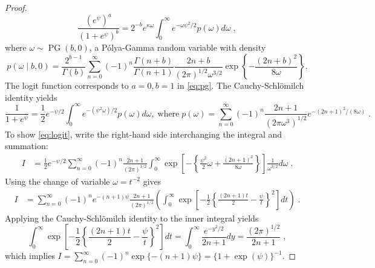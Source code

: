 \documentclass[ECP]{ejpecp} %
\def\CS{Cauchy-Schl\"omilch}
\def\PG{P{\'o}lya-Gamma}
\newcommand{\half}{\frac{1}{2}}
\begin{document}
\begin{proof}
\begin{equation}
  \frac{(e^{\psi})^a}{(1+e^{\psi})^b} = 2^{-b} e^{\kappa \omega} 
  \int_0^{\infty} e^{-\omega \psi^2/2} p(\omega) d\omega
  \;, 
  \label{eq:pg}
\end{equation}
where $\omega \sim \operatorname{PG}(b,0)$, a \PG{} random variable with density
\[
p(\omega \mid b, 0) = \frac{2^{b-1}}{\Gamma(b)} \sum_{n=0}^{\infty} (-1)^n \frac{\Gamma(n+b)}{\Gamma(n+1)} \frac{2n + b}{(2 \pi)^{1/2} \omega^{3/2}} 
\exp\left\{-\frac{(2 n + b)^2}{8 \omega} \right\}.
\]
The logit function corresponds to $a=0,b=1$ in \eqref{eq:pg}. The \CS{} identity yields
\begin{equation}
  \frac{1}{1+e^{\psi}} = \half e^{- \psi/2} \int_0^{\infty} e^{-(\psi^2\omega)/2} p(\omega) d\omega, \; \mbox{where} \; p(\omega) = \sum_{n=0}^{\infty} (-1)^n \frac{2n+1}{ (2 \pi \omega^3)^{1/2}} e^{-(2n+1)^2/(8 \omega)}
  \label{eq:logit}\;.
\end{equation}
To show \eqref{eq:logit}, write the right-hand side interchanging the integral and summation:
\begin{align*}
  I & = \half e^{-\psi/2} \sum_{n=0}^{\infty} (-1)^n \frac{2n+1}{(2 \pi)^{1/2}}  \int_0^{\infty} \exp\left[-\left\{ \frac{\psi^2}{2} \omega + \frac{(2n+1)^2}{8 \omega} \right\} \right] \frac{1}{\omega^{3/2}} d\omega \;. 
\end{align*}
Using the change of variable $\omega = t^{-2}$ gives
\begin{align*}
  I & = \sum_{n=0}^{\infty} (-1)^n e^{-(n+1)\psi} 
  \frac{2n + 1}{(2 \pi)^{1/2}} 
  \left( \int_{0}^{\infty} 
    \exp\left[-\half \left\{ \frac{(2n+1)t}{2} - \frac{\psi}{t}\right\}^2 \right] dt 
  \right)
  \;.
\end{align*}
Applying the \CS{} identity to the inner integral yields 
\[
\int_{0}^{\infty} 
\exp\left[-\half \left\{ \frac{(2n+1)t}{2} - \frac{\psi}{t}\right \}^2 \right] dt 
= \int_0^{\infty} \frac{e^{-y^2/2}}{2n+1} dy= \frac{(2\pi)^{1/2}}{2n+1}
\;,
\]
which implies $I = \sum_{n=0}^{\infty} (-1)^n \exp\{-(n+1) \psi\} = \{1+\exp(\psi)\}^{-1}$. 
\end{proof}
\end{document}
